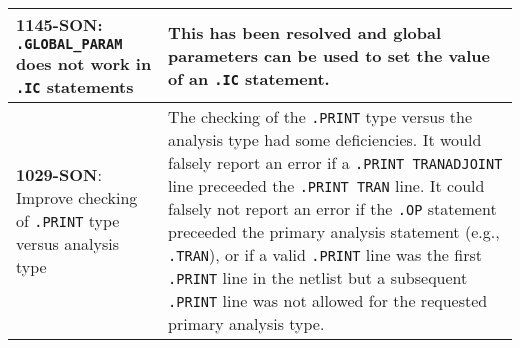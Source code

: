 {\begin{longtable}[h] {>{\raggedright\small}m{2in}|>{\raggedright\let\\\tabularnewline\small}m{3.5in}}
  \textbf{1145-SON}: \texttt{.GLOBAL\_PARAM} does not work
in \texttt{.IC} statements & This has been resolved and global
parameters can be used to set the value of an \texttt{.IC}
statement.\\ \hline

  \textbf{1029-SON}: Improve checking of \texttt{.PRINT} type versus
analysis type & The checking of the \texttt{.PRINT} type versus the
analysis type had some deficiencies. It would falsely report an error
if a \texttt{.PRINT TRANADJOINT} line preceeded the \texttt{.PRINT
TRAN} line.  It could falsely not report an error if the \texttt{.OP}
statement preceeded the primary analysis statement (e.g.,
\texttt{.TRAN}), or if a valid \texttt{.PRINT} line was the first \texttt{.PRINT}
line in the netlist but a subsequent \texttt{.PRINT} line was not allowed
for the requested primary analysis type. \\ \hline

\end{longtable}
}
